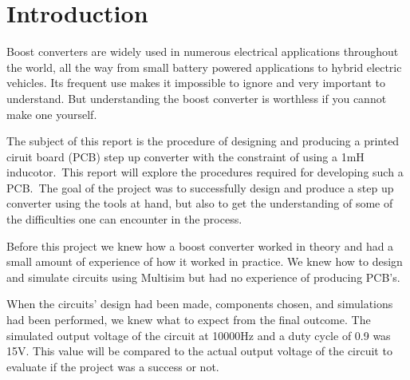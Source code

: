 
\section{Introduction}
Boost converters are widely used in numerous electrical applications throughout the world, all the way from small battery powered applications to hybrid electric vehicles. Its frequent use makes it impossible to ignore and very important to understand. But understanding the boost converter is worthless if you cannot make one yourself.\

The subject of this report is the procedure of designing and producing a printed ciruit board (PCB) step up converter with the constraint of using a 1mH inducotor.\
This report will explore the procedures required for developing such a PCB.\ 
The goal of the project was to successfully design and produce a step up converter using the tools at hand, but also to get the understanding of some of the difficulties one can encounter in the process.\

Before this project we knew how a boost converter worked in theory and had a small amount of experience of how it worked in practice. We knew how to design and simulate circuits using Multisim but had no experience of producing PCB's.\

When the circuits' design had been made, components chosen, and simulations had been performed, we knew what to expect from the final outcome. The simulated output voltage of the circuit at 10000Hz and a duty cycle of 0.9 was 15V. This value will be compared to the actual output voltage of the circuit to evaluate if the project was a success or not.\



